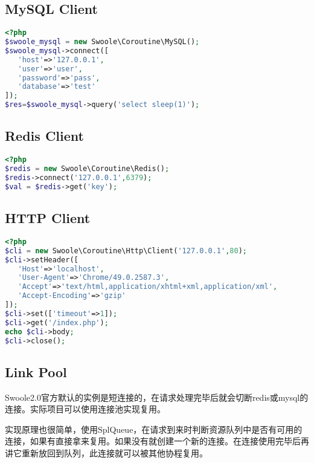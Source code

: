 \subsection{MySQL Client}



\begin{lstlisting}[language=PHP]
<?php
$swoole_mysql = new Swoole\Coroutine\MySQL();
$swoole_mysql->connect([
   'host'=>'127.0.0.1',
   'user'=>'user',
   'password'=>'pass',
   'database'=>'test'
]);
$res=$swoole_mysql->query('select sleep(1)');
\end{lstlisting}

\subsection{Redis Client}


\begin{lstlisting}[language=PHP]
<?php
$redis = new Swoole\Coroutine\Redis();
$redis->connect('127.0.0.1',6379);
$val = $redis->get('key');
\end{lstlisting}

\subsection{HTTP Client}


\begin{lstlisting}[language=PHP]
<?php
$cli = new Swoole\Coroutine\Http\Client('127.0.0.1',80);
$cli->setHeader([
   'Host'=>'localhost',
   'User-Agent'=>'Chrome/49.0.2587.3',
   'Accept'=>'text/html,application/xhtml+xml,application/xml',
   'Accept-Encoding'=>'gzip'
]);
$cli->set(['timeout'=>1]);
$cli->get('/index.php');
echo $cli->body;
$cli->close();
\end{lstlisting}



\subsection{Link Pool}

Swoole2.0官方默认的实例是短连接的，在请求处理完毕后就会切断redis或mysql的连接。实际项目可以使用连接池实现复用。

实现原理也很简单，使用SplQueue，在请求到来时判断资源队列中是否有可用的连接，如果有直接拿来复用。如果没有就创建一个新的连接。在连接使用完毕后再讲它重新放回到队列，此连接就可以被其他协程复用。



